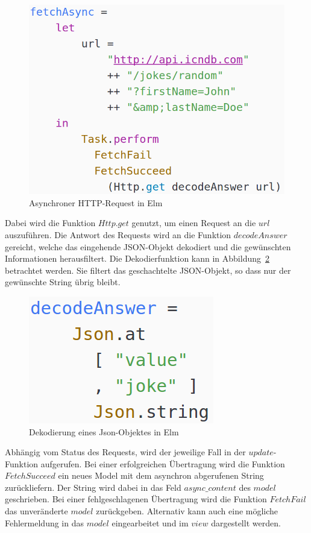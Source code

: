 \begin{figure}[h]
\centering
\includegraphics[scale=0.3]{img/fetchasync-async.png}
\caption{Asynchroner \ac{HTTP}-Request in Elm}\label{fig:fetchasync-async}
\end{figure}
Dabei wird die Funktion $Http.get$ genutzt, um einen Request an die $url$ auszuführen. Die Antwort des Requests wird an die Funktion $decodeAnswer$ gereicht, welche das eingehende \ac{JSON}-Objekt dekodiert und die gewünschten Informationen herausfiltert. Die Dekodierfunktion kann in Abbildung~\ref{fig:decodeanswer-async} betrachtet werden. Sie filtert das geschachtelte \ac{JSON}-Objekt, so dass nur der gewünschte String übrig bleibt.
\begin{figure}[h]
\centering
\includegraphics[scale=0.4]{img/decodeanswer-async.png}
\caption{Dekodierung eines Json-Objektes in Elm}\label{fig:decodeanswer-async}
\end{figure}
Abhängig vom Status des Requests, wird der jeweilige Fall in der $update$-Funktion aufgerufen. Bei einer erfolgreichen Übertragung wird die Funktion $FetchSucceed$ ein neues Model mit dem asynchron abgerufenen String zurückliefern. Der String wird dabei in das Feld $async\_content$ des $model$ geschrieben. Bei einer fehlgeschlagenen Übertragung wird die Funktion $FetchFail$ das unveränderte $model$ zurückgeben. Alternativ kann auch eine mögliche Fehlermeldung in das $model$ eingearbeitet und im $view$ dargestellt werden.
